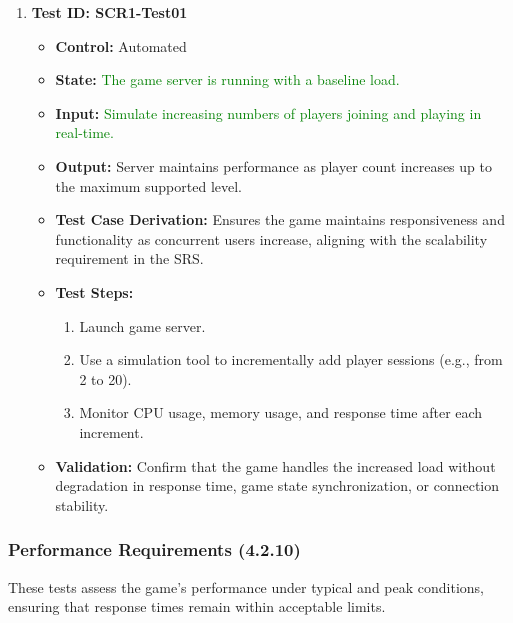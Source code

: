 \documentclass[12pt]{article}
\newcommand{\added}[1]{\textcolor{green}{#1}}
\begin{document}
\begin{enumerate}
    \item \textbf{Test ID: SCR1-Test01}
    \begin{itemize}
        \item \textbf{Control:} Automated
        \item \textbf{State:} \added{The game server is running with a baseline load.}
        \item \textbf{Input:} \added{Simulate increasing numbers of players joining and playing in real-time.}
        \item \textbf{Output:} Server maintains performance as player count increases up to the maximum supported level.
        \item \textbf{Test Case Derivation:} Ensures the game maintains responsiveness and functionality as concurrent users increase, aligning with the scalability requirement in the SRS.
        \item \textbf{Test Steps:}
        \begin{enumerate}
            \item Launch game server.
            \item Use a simulation tool to incrementally add player sessions (e.g., from 2 to 20).
            \item Monitor CPU usage, memory usage, and response time after each increment.
        \end{enumerate}
        \item \textbf{Validation:} Confirm that the game handles the increased load without degradation in response time, game state synchronization, or connection stability.
    \end{itemize}
\end{enumerate}

\subsubsection{Performance Requirements (4.2.10)}

These tests assess the game’s performance under typical and peak conditions, ensuring that response times remain within acceptable limits.
\end{document}
